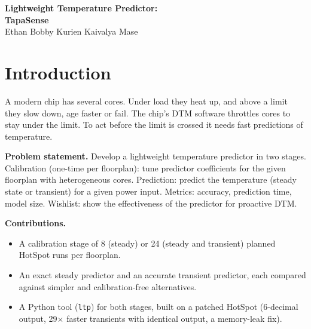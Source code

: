 \documentclass[11pt,a4paper]{article}
\newcommand{\us}{\,$\mu$s}
\begin{document}
\begin{center}
{\LARGE\bfseries Lightweight Temperature Predictor:\\[2pt] TapaSense}\\[8pt]
Ethan Bobby Kurien \quad Kaivalya Mase
\end{center}

\begin{abstract}
Dynamic thermal management (DTM) needs core temperatures every millisecond, and ideally a few
milliseconds ahead. The HotSpot simulator computes them accurately but needs 0.24\,s per steady
answer and 5.5\,ms per 1\,ms transient step. We built a two-stage predictor for heterogeneous
multicore floorplans. A one-time calibration runs HotSpot 8 times (steady) or 24 times (steady and
transient) per floorplan with 1\,W in one core at a time. The prediction stage then uses only the
stored coefficients. Because HotSpot without leakage is linear, the steady predictor (an influence
matrix) is exact to HotSpot's printed precision ($3\times10^{-5}$\,K worst) at 2.6\us\ per
prediction from under 1\,kB. The transient predictor (a sum of four exponentials per pair of
cores) is within 0.06--0.09\,K on average and 0.3\,K worst, at 3\us\ per step from about 4\,kB.
Every calibration-free alternative is 0.5--2.7\,K off on average.
\end{abstract}

\tableofcontents

\section{Introduction}
A modern chip has several cores. Under load they heat up, and above a limit they slow down, age
faster or fail. The chip's DTM software throttles cores to stay under the limit. To act before the
limit is crossed it needs fast predictions of temperature.

\textbf{Problem statement.} Develop a lightweight temperature predictor in two stages.
Calibration (one-time per floorplan): tune predictor coefficients for the given floorplan with
heterogeneous cores. Prediction: predict the temperature (steady state or transient) for a given
power input. Metrics: accuracy, prediction time, model size. Wishlist: show the effectiveness of
the predictor for proactive DTM.

\textbf{Contributions.}
\begin{itemize}
  \item A calibration stage of 8 (steady) or 24 (steady and transient) planned HotSpot runs per
        floorplan.
  \item An exact steady predictor and an accurate transient predictor, each compared against
        simpler and calibration-free alternatives.
  \item A Python tool (\texttt{ltp}) for both stages, built on a patched HotSpot (6-decimal output,
        29$\times$ faster transients with identical output, a memory-leak fix).
\end{itemize}
\end{document}

